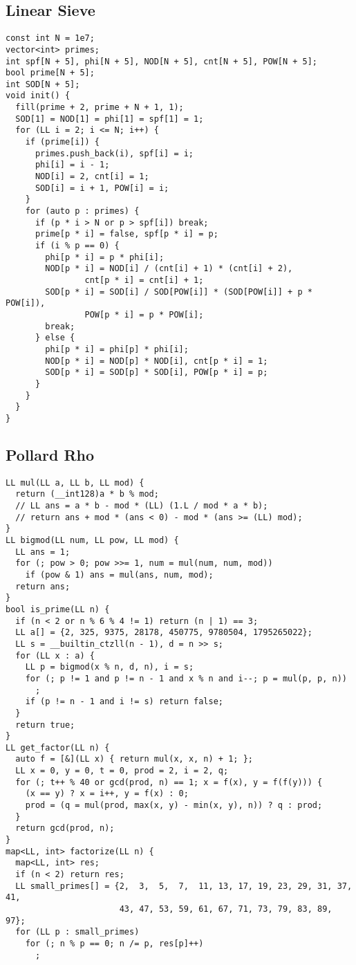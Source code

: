 \documentclass[FSZ,a4paper,onesided]{article}
\begin{document}
\begin{multicols*}{\COLS}
\subsection{Linear Sieve}
\begin{lstlisting}
const int N = 1e7;
vector<int> primes;
int spf[N + 5], phi[N + 5], NOD[N + 5], cnt[N + 5], POW[N + 5];
bool prime[N + 5];
int SOD[N + 5];
void init() {
  fill(prime + 2, prime + N + 1, 1);
  SOD[1] = NOD[1] = phi[1] = spf[1] = 1;
  for (LL i = 2; i <= N; i++) {
    if (prime[i]) {
      primes.push_back(i), spf[i] = i;
      phi[i] = i - 1;
      NOD[i] = 2, cnt[i] = 1;
      SOD[i] = i + 1, POW[i] = i;
    }
    for (auto p : primes) {
      if (p * i > N or p > spf[i]) break;
      prime[p * i] = false, spf[p * i] = p;
      if (i % p == 0) {
        phi[p * i] = p * phi[i];
        NOD[p * i] = NOD[i] / (cnt[i] + 1) * (cnt[i] + 2),
                cnt[p * i] = cnt[i] + 1;
        SOD[p * i] = SOD[i] / SOD[POW[i]] * (SOD[POW[i]] + p * POW[i]),
                POW[p * i] = p * POW[i];
        break;
      } else {
        phi[p * i] = phi[p] * phi[i];
        NOD[p * i] = NOD[p] * NOD[i], cnt[p * i] = 1;
        SOD[p * i] = SOD[p] * SOD[i], POW[p * i] = p;
      }
    }
  }
}

\end{lstlisting}
\subsection{Pollard Rho}
\begin{lstlisting}
LL mul(LL a, LL b, LL mod) {
  return (__int128)a * b % mod;
  // LL ans = a * b - mod * (LL) (1.L / mod * a * b);
  // return ans + mod * (ans < 0) - mod * (ans >= (LL) mod);
}
LL bigmod(LL num, LL pow, LL mod) {
  LL ans = 1;
  for (; pow > 0; pow >>= 1, num = mul(num, num, mod))
    if (pow & 1) ans = mul(ans, num, mod);
  return ans;
}
bool is_prime(LL n) {
  if (n < 2 or n % 6 % 4 != 1) return (n | 1) == 3;
  LL a[] = {2, 325, 9375, 28178, 450775, 9780504, 1795265022};
  LL s = __builtin_ctzll(n - 1), d = n >> s;
  for (LL x : a) {
    LL p = bigmod(x % n, d, n), i = s;
    for (; p != 1 and p != n - 1 and x % n and i--; p = mul(p, p, n))
      ;
    if (p != n - 1 and i != s) return false;
  }
  return true;
}
LL get_factor(LL n) {
  auto f = [&](LL x) { return mul(x, x, n) + 1; };
  LL x = 0, y = 0, t = 0, prod = 2, i = 2, q;
  for (; t++ % 40 or gcd(prod, n) == 1; x = f(x), y = f(f(y))) {
    (x == y) ? x = i++, y = f(x) : 0;
    prod = (q = mul(prod, max(x, y) - min(x, y), n)) ? q : prod;
  }
  return gcd(prod, n);
}
map<LL, int> factorize(LL n) {
  map<LL, int> res;
  if (n < 2) return res;
  LL small_primes[] = {2,  3,  5,  7,  11, 13, 17, 19, 23, 29, 31, 37, 41,
                       43, 47, 53, 59, 61, 67, 71, 73, 79, 83, 89, 97};
  for (LL p : small_primes)
    for (; n % p == 0; n /= p, res[p]++)
      ;


\end{lstlisting}
\end{multicols*}
\end{document}
